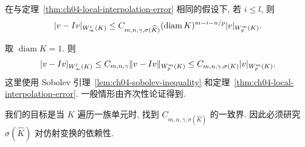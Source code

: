 \setcounter{thmcount}{6}
\begin{Corollary}
\label{cor:ch04-local-interpolation-linfty-error}
在与定理~\ref{thm:ch04-local-interpolation-error} 相同的假设下, 若 $i\leq l$, 则
\begin{equation}
\MathBookFormulaID{formula-ch04-local-interpolation-linfty-error}
\label{eq:ch04-local-interpolation-linfty-error}
|v-Iv|_{W_\infty^i(K)}
\leq C_{m,n,\gamma,\sigma(\widehat K)}
(\operatorname{diam}K)^{m-i-n/p}|v|_{W_p^m(K)}.
\end{equation}
\end{Corollary}
\begin{Proof}
取 $\operatorname{diam}K=1$. 则
\[
\MathBookFormulaID{formula-ch04-local-interpolation-linfty-proof}
|v-Iv|_{W_\infty^l(K)}
\leq C_{m,n,\gamma}\|v-Iv\|_{W_p^m(K)}
\leq C_{m,n,\gamma,\sigma(K)}|v|_{W_p^m(K)}.
\]
这里使用 Sobolev 引理~\ref{lem:ch04-sobolev-inequality} 和定理~\ref{thm:ch04-local-interpolation-error}. 一般情形由齐次性论证得到.
\end{Proof}

我们的目标是当 $K$ 遍历一族单元时, 找到 $C_{m,n,\gamma,\sigma(\widehat K)}$ 的一致界. 因此必须研究 $\sigma(\widehat K)$ 对仿射变换的依赖性.

